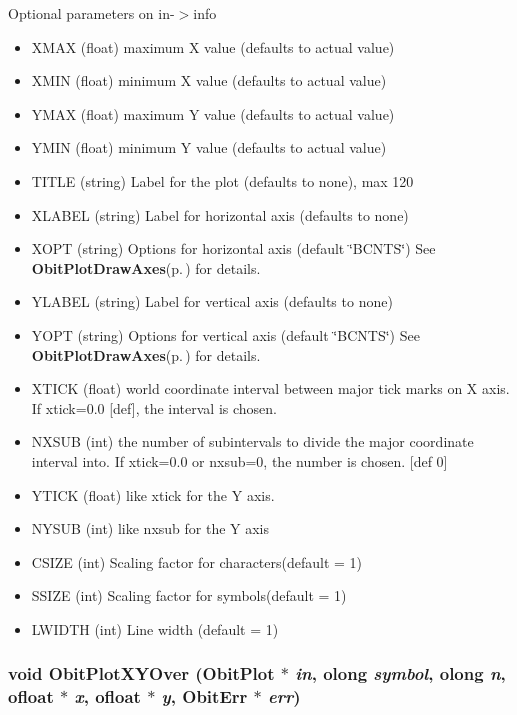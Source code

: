 Optional parameters on in-$>$info \begin{itemize}
\item XMAX (float) maximum X value (defaults to actual value) \item XMIN (float) minimum X value (defaults to actual value) \item YMAX (float) maximum Y value (defaults to actual value) \item YMIN (float) minimum Y value (defaults to actual value) \item TITLE (string) Label for the plot (defaults to none), max 120 \item XLABEL (string) Label for horizontal axis (defaults to none) \item XOPT (string) Options for horizontal axis (default \char`\"{}BCNTS\char`\"{}) See {\bf Obit\-Plot\-Draw\-Axes}{\rm (p.\,\pageref{ObitPlot_8c_a19})} for details. \item YLABEL (string) Label for vertical axis (defaults to none) \item YOPT (string) Options for vertical axis (default \char`\"{}BCNTS\char`\"{}) See {\bf Obit\-Plot\-Draw\-Axes}{\rm (p.\,\pageref{ObitPlot_8c_a19})} for details. \item XTICK (float) world coordinate interval between major tick marks on X axis. If xtick=0.0 [def], the interval is chosen. \item NXSUB (int) the number of subintervals to divide the major coordinate interval into. If xtick=0.0 or nxsub=0, the number is chosen. [def 0] \item YTICK (float) like xtick for the Y axis. \item NYSUB (int) like nxsub for the Y axis \item CSIZE (int) Scaling factor for characters(default = 1) \item SSIZE (int) Scaling factor for symbols(default = 1) \item LWIDTH (int) Line width (default = 1) \end{itemize}
\subsubsection{\setlength{\rightskip}{0pt plus 5cm}void Obit\-Plot\-XYOver ({\bf Obit\-Plot} $\ast$ {\em in}, {\bf olong} {\em symbol}, {\bf olong} {\em n}, {\bf ofloat} $\ast$ {\em x}, {\bf ofloat} $\ast$ {\em y}, {\bf Obit\-Err} $\ast$ {\em err})}\label{ObitPlot_8c_a11}


